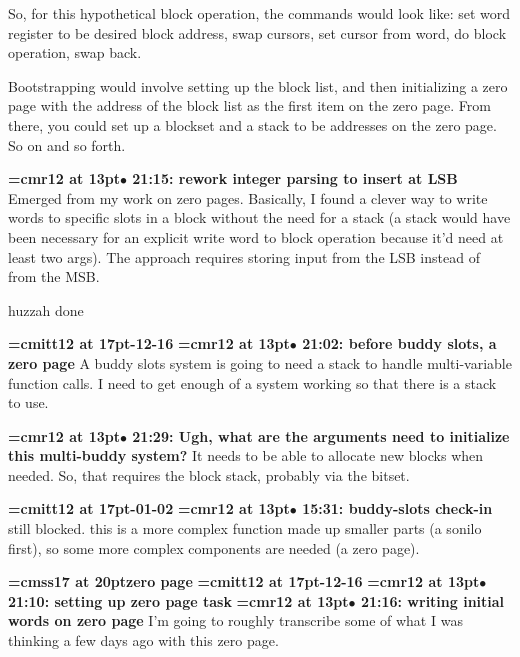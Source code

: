 So, for this hypothetical block operation, the commands would look like: set word register to be desired block address, swap cursors, set cursor from word, do block operation, swap back.
\par

Bootstrapping would involve setting up the block list, and then initializing a zero page with the address of the block list as the first item on the zero page. From there, you could set up a blockset and a stack to be addresses on the zero page. So on and so forth.
\par

{\smallskip\noindent\bf\font\titlefont=cmr12 at 13pt\titlefont $\bullet$ 21:15: rework integer parsing to insert at LSB}\smallskip
Emerged from my work on zero pages. Basically, I found a clever way to write words to specific slots in a block without the need for a stack (a stack would have been necessary for an explicit write word to block operation because it'd need at least two args). The approach requires storing input from the LSB instead of from the MSB.
\par

huzzah done
\par

{\medskip\noindent\bf\font\titlefont=cmitt12 at 17pt-12-16}\medskip
{\smallskip\noindent\bf\font\titlefont=cmr12 at 13pt\titlefont $\bullet$ 21:02: before buddy slots, a zero page}\smallskip
A buddy slots system is going to need a stack to handle multi-variable function calls. I need to get enough of a system working so that there is a stack to use.
\par

{\smallskip\noindent\bf\font\titlefont=cmr12 at 13pt\titlefont $\bullet$ 21:29: Ugh, what are the arguments need to initialize this multi-buddy system?}\smallskip
It needs to be able to allocate new blocks when needed. So, that requires the block stack, probably via the bitset.
\par

{\medskip\noindent\bf\font\titlefont=cmitt12 at 17pt-01-02}\medskip
{\smallskip\noindent\bf\font\titlefont=cmr12 at 13pt\titlefont $\bullet$ 15:31: buddy-slots check-in}\smallskip
still blocked. this is a more complex function made up smaller parts (a sonilo first), so some more complex components are needed (a zero page).
\par

{\medskip\noindent\bf\font\titlefont=cmss17 at 20pt\titlefont zero page}\medskip
{\medskip\noindent\bf\font\titlefont=cmitt12 at 17pt-12-16}\medskip
{\smallskip\noindent\bf\font\titlefont=cmr12 at 13pt\titlefont $\bullet$ 21:10: setting up zero page task}\smallskip
{\smallskip\noindent\bf\font\titlefont=cmr12 at 13pt\titlefont $\bullet$ 21:16: writing initial words on zero page}\smallskip
I'm going to roughly transcribe some of what I was thinking a few days ago with this zero page.
\par

